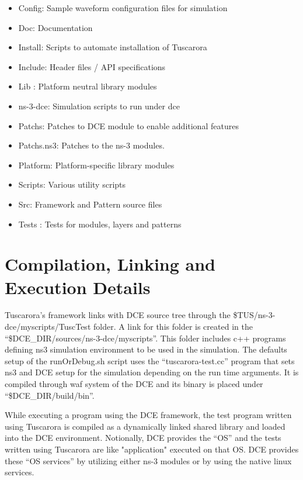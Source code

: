 \begin{itemize}
\item Config: Sample waveform configuration files for simulation
\item Doc: Documentation
\item Install: Scripts to automate installation of Tuscarora
\item Include: Header files / API specifications
\item Lib : Platform neutral library modules
\item ns-3-dce: Simulation scripts to run under dce
\item Patchs: Patches to DCE module to enable additional features %
\item Patchs.ns3: Patches to the ns-3 modules.
\item Platform: Platform-specific library modules
\item Scripts: Various utility scripts
\item Src: Framework and Pattern source files
\item Tests : Tests for modules, layers and patterns
\end{itemize}

\section{Compilation, Linking and Execution Details}\label{CompilationDetails}

Tuscarora's framework links with DCE source tree through the \$TUS/ns-3-dce/myscripts/TuscTest folder.  A link for this folder is created in the ``\$DCE\_DIR/sources/ns-3-dce/myscripts''.
This folder includes c++ programs defining ns3 simulation environment to be used in the simulation. 
The defaults setup of the runOrDebug.sh script uses the ``tuscarora-test.cc'' program that sets ns3 and DCE setup for the simulation depending on the run time arguments. It is compiled through waf system of the DCE and its binary is placed under ``\$DCE\_DIR/build/bin''.

While executing a program using the DCE framework, the test program written using Tuscarora is compiled as a dynamically linked shared library and loaded into the DCE environment. Notionally, DCE provides the ``OS'' and  the tests written using Tuscarora are like "application" executed on that OS. DCE provides these ``OS services'' by utilizing either ns-3 modules or by using the native linux services.

